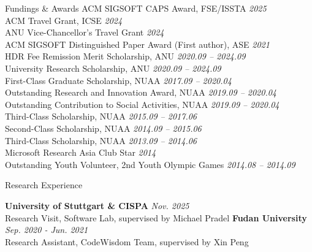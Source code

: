 \documentclass[
	11pt, %
]{resume} %
\begin{document}
\begin{rSection}{Fundings \& Awards}
ACM SIGSOFT CAPS Award, FSE/ISSTA \hfill \textit{2025} \\
ACM Travel Grant, ICSE \hfill \textit{2024} \\
ANU Vice-Chancellor's Travel Grant \hfill \textit{2024} \\
ACM SIGSOFT Distinguished Paper Award (First author), ASE \hfill \textit{2021} \\
HDR Fee Remission Merit Scholarship, ANU \hfill \textit{2020.09 -- 2024.09} \\
University Research Scholarship, ANU \hfill \textit{2020.09 -- 2024.09} \\
First-Class Graduate Scholarship, NUAA \hfill \textit{2017.09 -- 2020.04} \\
Outstanding Research and Innovation Award, NUAA \hfill \textit{2019.09 -- 2020.04} \\
Outstanding Contribution to Social Activities, NUAA \hfill \textit{2019.09 -- 2020.04} \\
Third-Class Scholarship, NUAA \hfill \textit{2015.09 -- 2017.06} \\
Second-Class Scholarship, NUAA \hfill \textit{2014.09 -- 2015.06} \\
Third-Class Scholarship, NUAA \hfill \textit{2013.09 -- 2014.06} \\
Microsoft Research Asia Club Star \hfill \textit{2014} \\
Outstanding Youth Volunteer, 2nd Youth Olympic Games \hfill \textit{2014.08 -- 2014.09}
\end{rSection}

\begin{rSection}{Research Experience}

\textbf{University of Stuttgart \& CISPA} \hfill \textit{Nov. 2025} \\
Research Visit, Software Lab, supervised by Michael Pradel
\newline\newline
\textbf{Fudan University} \hfill \textit{Sep. 2020 - Jun. 2021} \\
Research Assistant, CodeWisdom Team, supervised by Xin Peng

\end{rSection}
\end{document}
